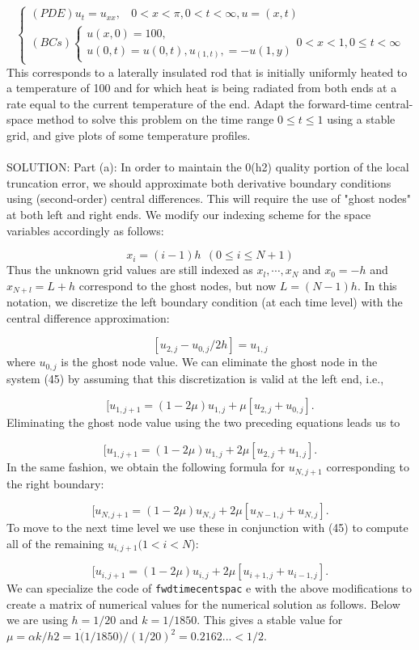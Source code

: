 \documentclass[../main.tex]{subfiles}
\begin{document}
$$\begin{cases} 
	(PDE) u_t=u_{xx},
	~~~~0<x<\pi, 0<t<\infty,u=(x,t)\\
(BCs)
		\begin{cases}
		u(x,0)=100,\\
		u(0,t)=u(0,t), u_(1,t), =-u(1,y)
		\end{cases}
		0 < x < 1, 0 \leqslant t < \infty 
	\end{cases}$$
This corresponds to a laterally insulated rod that is initially uniformly heated to a temperature of 100 and for which heat is being radiated from both ends at a rate equal to the current temperature of the end. Adapt the forward-time central-space method to solve this problem on the time range $0 \leqslant t \leqslant 1$ using a stable grid, and give plots of some temperature profiles.
\\
\\
SOLUTION: Part (a): In order to maintain the 0(h2) quality portion of the local truncation error, we should approximate both derivative boundary conditions using (second-order) central differences. This will require the use of "ghost nodes" at both left and right ends. We modify our indexing scheme for the space variables accordingly as follows: 

$$x_i=(i-1)h~~(0\leqslant i \leqslant N+1)$$
Thus the unknown grid values are still indexed as $x_l,\cdots,x_N$ and $x_0=-h$ and $x_{N+l} =L + h$ correspond to the ghost nodes, but now $L = (N - 1 )h$. In this notation, we discretize the left boundary condition (at each time level) with the central difference approximation:

$$[u_{2,j}-u_{0,j}/2h]=u_{1,j}$$
where $u_{0,j}$ is the ghost node value. We can eliminate the ghost node in the system (45) by assuming that this discretization is valid at the left end, i.e.,

$$[u_{1,j+1}=(1-2\mu)u_{1,j}+\mu[u_{2,j}+u_{0,j}].$$
Eliminating the ghost node value using the two preceding equations leads us to

$$[u_{1,j+1}=(1-2\mu)u_{1,j}+2\mu[u_{2,j}+u_{1,j}].$$
In the same fashion, we obtain the following formula for $u_{N,j+1}$ corresponding to the right boundary: 

$$[u_{N,j+1}=(1-2\mu)u_{N,j}+2\mu[u_{N-1,j}+u_{N,j}].$$
To move to the next time level we use these in conjunction with (45) to compute all of the remaining $u_{i,j+1} (1 <i<N$):

$$[u_{i,j+1}=(1-2\mu)u_{i,j}+2\mu[u_{i+1,j}+u_{i-1,j}].$$
We can specialize the code of \texttt{fwdtimecentspac} e with the above modifications to create a matrix of numerical values for the numerical solution as follows. Below we are using $h = 1/20$ and $k = 1/1850$. This gives a stable value for $\mu = \alpha k/h2 = 1\dot(1/1850)/(1/20)^2 = 0.2162...< 1/2$.
\end{document}
